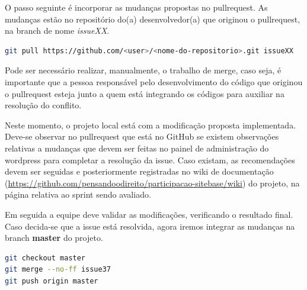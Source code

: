 O passo seguinte é incorporar as mudanças propostas no \gls{pullrequest}. As mudanças estão no repositório do(a) desenvolvedor(a) que originou o \gls{pullrequest}, na \gls{branch} de nome \textit{issueXX}.
\begin{lstlisting}[language=bash,caption={Recebendo as modificações do branch a ser incorporado}]
git pull https://github.com/<user>/<nome-do-repositorio>.git issueXX
\end{lstlisting}
Pode ser necessário realizar, manualmente, o trabalho de \gls{merge}, caso seja, é importante que a pessoa responsável pelo desenvolvimento do código que originou o \gls{pullrequest} esteja junto a quem está integrando os códigos para auxiliar na resolução do conflito.

Neste momento, o projeto local está com a modificação proposta implementada. Deve-se observar no \gls{pullrequest} que está no GitHub se existem observações relativas a mudanças que devem ser feitas no painel de administração do wordpress para completar a resolução da \gls{issue}. Caso existam, as recomendações devem ser seguidas e posteriormente registradas no wiki de documentação (\url{https://github.com/pensandoodireito/participacao-sitebase/wiki}) do projeto, na página relativa ao \gls{sprint} sendo avaliado.

Em seguida a equipe deve validar as modificações, verificando o resultado final. Caso decida-se que a \gls{issue} está resolvida, agora iremos integrar as mudanças na \gls{branch} \textbf{master} do projeto.
\begin{lstlisting}[language=bash,caption={Enviando as modificações aceitas para o branch master}]
git checkout master
git merge --no-ff issue37
git push origin master
\end{lstlisting}
